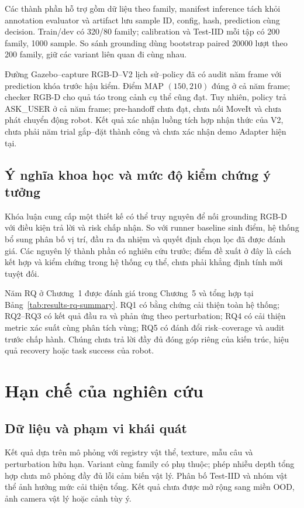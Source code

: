 Các thành phần hỗ trợ gồm dữ liệu theo family, manifest inference
tách khỏi annotation evaluator và artifact lưu sample ID, config,
hash, prediction cùng decision. Train/dev có 320/80 family;
calibration và Test-IID mỗi tập có 200 family, 1000 sample.
So sánh grounding dùng bootstrap paired 20000 lượt theo 200 family,
giữ các variant liên quan đi cùng nhau.

Đường Gazebo--capture RGB-D--V2 lịch sử--policy đã có audit năm frame
với prediction khóa trước hậu kiểm. Điểm MAP $(150,210)$ đúng
ở cả năm frame; checker RGB-D cho quả táo trong cảnh cụ thể cũng đạt.
Tuy nhiên, policy trả ASK\_USER ở cả năm frame; pre-handoff chưa đạt,
chưa nối MoveIt và chưa phát chuyển động robot. Kết quả xác nhận luồng tích hợp nhận thức của V2, chưa phải năm trial gắp--đặt thành công và chưa xác nhận demo Adapter hiện tại.

\subsection{Ý nghĩa khoa học và mức độ kiểm chứng ý tưởng}

Khóa luận cung cấp một thiết kế có thể truy nguyên để nối grounding
RGB-D với điều kiện trả lời và risk chấp nhận. So với runner baseline
sinh điểm, hệ thống bổ sung phân bố vị trí, đầu ra đa nhiệm và quyết
định chọn lọc đã được đánh giá. Các nguyên lý thành phần có nghiên
cứu trước; điểm đề xuất ở đây là cách kết hợp và kiểm chứng trong
hệ thống cụ thể, chưa phải khẳng định tính mới tuyệt đối.

Năm RQ ở Chương~1 được đánh giá trong Chương~5 và tổng hợp tại
Bảng~\ref{tab:results-rq-summary}. RQ1 có bằng chứng cải thiện toàn
hệ thống; RQ2--RQ3 có kết quả đầu ra và phản ứng theo perturbation;
RQ4 có cải thiện metric xác suất cùng phân tích vùng; RQ5 có
đánh đổi risk--coverage và audit trước chấp hành. Chúng chưa trả
lời đầy đủ đóng góp riêng của kiến trúc, hiệu quả recovery hoặc
task success của robot.

\section{Hạn chế của nghiên cứu}
\label{sec:conclusion-limitations}

\subsection{Dữ liệu và phạm vi khái quát}

Kết quả dựa trên mô phỏng với registry vật thể, texture, mẫu câu và
perturbation hữu hạn. Variant cùng family có phụ thuộc; phép nhiễu
depth tổng hợp chưa mô phỏng đầy đủ lỗi cảm biến vật lý. Phân bố
Test-IID và nhóm vật thể ảnh hưởng mức cải thiện tổng. Kết quả
chưa được mở rộng sang miền OOD, ảnh camera vật lý hoặc cảnh tùy ý.

